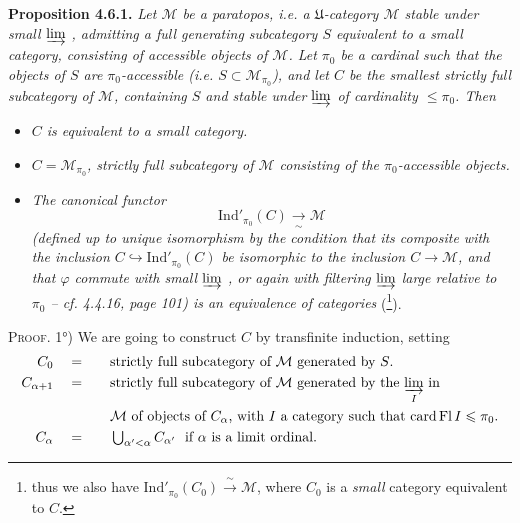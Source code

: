 \documentclass[11pt]{article}
\newcommand{\msp}[1]{\marginpar{\footnotesize [#1]}}
\newcommand{\Ind}{\mathrm{Ind}}
\begin{document}
\textbf{Proposition 4.6.1.} \textit{Let $\mathcal{M}$ be a paratopos, i.e. a $\mathfrak{U}$-category $\mathcal{M}$ stable under small $\varinjlim$ , admitting a full generating subcategory $S$ equivalent to a small category, consisting of accessible objects of $\mathcal{M}$. Let $\pi_0$ be a cardinal such that the objects of $S$ are $\pi_0$-accessible (i.e. $S\subset\mathcal{M}_{\pi_0}$), and let $C$ be the smallest strictly full subcategory of $\mathcal{M}$, containing $S$ and stable under $\varinjlim$ of cardinality $\leqslant\pi_0$. Then} %
\begin{itemize}[leftmargin=2.5em]
\item[\textit{1°)}] \textit{$C$ is equivalent to a small category.}

\msp{page 140}

\item[\textit{2°)}] \textit{$C=\mathcal{M}_{\pi_0}$, strictly full subcategory of $\mathcal{M}$ consisting of the $\pi_0$-accessible objects.}
\item[\textit{3°)}] \textit{The canonical functor}
\[
\Ind'_{\pi_0}(C) \xrightarrow[\sim]{} \mathcal{M} %
\]
\textit{(defined up to unique isomorphism by the condition that its composite with the inclusion $C\hookrightarrow\Ind'_{\pi_0}(C)$ be isomorphic to the inclusion $C\longrightarrow\mathcal{M}$, and that $\varphi$ commute with small $\varinjlim$ , or again with filtering $\varinjlim$ large relative to $\pi_0$ – cf. 4.4.16, page 101) is an equivalence of categories} (\footnote[54]{thus we also have $\Ind'_{\pi_0}(C_0)\xrightarrow{\ \sim\ }\mathcal{M}$, where $C_0$ is a \textit{small} category equivalent to $C$.}).
\end{itemize}

\textsc{Proof}. 1°) We are going to construct $C$ by transfinite induction, setting
\[
\begin{aligned}
C_0 &\quad=\quad && \text{strictly full subcategory of $\mathcal{M}$ generated by $S$.}\\
C_{\alpha+1} &\quad=\quad && \text{strictly full subcategory of $\mathcal{M}$ generated by the $\varinjlim\limits_{I}$ in}\\
& && \text{$\mathcal{M}$ of objects of $C_\alpha$, with $I$ a category such that $\operatorname{card}\operatorname{Fl}I\leqslant\pi_0$.}\\
C_\alpha &\quad=\quad && \textstyle\bigcup_{\alpha'<\alpha}C_{\alpha'}\ \text{ if $\alpha$ is a limit ordinal.}
\end{aligned}
\]
\end{document}
